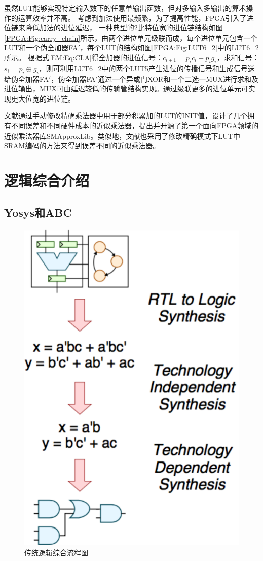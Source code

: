 虽然LUT能够实现特定输入数下的任意单输出函数，但对多输入多输出的算术操作的运算效率并不高。
考虑到加法使用最频繁，为了提高性能，FPGA引入了进位链来降低加法的进位延迟，
一种典型的2比特位宽的进位链结构如图\ref{FPGA:Fig:carry_chain}所示，由两个进位单元级联而成，每个进位单元包含一个LUT和一个伪全加器FA$'$，每个LUT的结构如图\ref{FPGA:Fig:LUT6_2}中的LUT6\_2所示。
根据式\eqref{EM:Eq:CLA}得全加器的进位信号：$c_{i+1} = p_i c_i  + \overline{p_i} g_i$，求和信号：$s_{i} = p_i \oplus g_i$，则可利用LUT6\_2中的两个LUT5产生进位的传播信号和生成信号送给伪全加器FA$'$，伪全加器FA$'$通过一个异或门XOR和一个二选一MUX进行求和及进位输出，MUX可由延迟较低的传输管结构实现。通过级联更多的进位单元可实现更大位宽的进位链。

文献\cite{AC:AM:FPGA:SMApproxLib}通过手动修改精确乘法器中用于部分积累加的LUT的INIT值，设计了几个拥有不同误差和不同硬件成本的近似乘法器，提出并开源了第一个面向FPGA领域的近似乘法器库SMApproxLib。类似地，文献\cite{AC:AM:FPGA:CaCc,AC:AM:FPGA:FPT22,AC:AM:FPGA:TCAD22}也采用了修改精确模式下LUT中SRAM编码的方法来得到误差不同的近似乘法器。



\section{逻辑综合介绍}


\subsection{Yosys和ABC}

\begin{figure}[!htbp]
    \centering
    \includegraphics[width=0.4\linewidth]{./figs/LS-flow.png}
    \caption{传统逻辑综合流程图}
    \label{LS:flow}
\end{figure}


